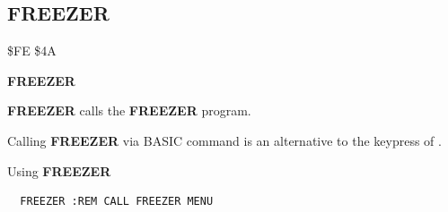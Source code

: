 
\newpage
\subsection{FREEZER}
\begin{description}[leftmargin=2cm,style=nextline]
\item [Token:] \$FE \$4A
\item [Format:] {\bf FREEZER}
\item [Usage:] {\bf FREEZER} calls the {\bf FREEZER} program.

\item [Remarks:]
      Calling {\bf FREEZER} via BASIC command is an alternative
      to the keypress of .

\item [Examples:] Using {\bf FREEZER}
\begin{tcolorbox}[colback=black,coltext=white]
\verbatimfont{\codefont}
\begin{verbatim}
  FREEZER :REM CALL FREEZER MENU
\end{verbatim}
\end{tcolorbox}
\end{description}


\newpage
